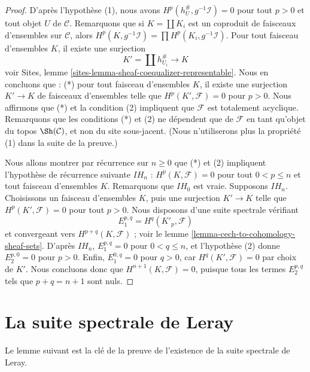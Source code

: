 \begin{proof}
D'après l'hypothèse (1), nous avons
$H^p(h_U^\#, g^{-1}\mathcal{I}) = 0$ pour tout $p > 0$ et tout objet $U$ de
$\mathcal{C}$. Remarquons que si $K = \coprod K_i$ est un coproduit de
faisceaux d'ensembles sur $\mathcal{C}$, alors
$H^p(K, g^{-1}\mathcal{I}) = \prod H^p(K_i, g^{-1}\mathcal{I})$.
Pour tout faisceau d'ensembles $K$, il existe une surjection
$$
K' = \coprod h_{U_i}^\# \longrightarrow K
$$
voir Sites, lemme \ref{sites-lemma-sheaf-coequalizer-representable}.
Nous en concluons que : (*) pour tout faisceau d'ensembles $K$, il existe une
surjection $K' \to K$ de faisceaux d'ensembles telle que
$H^p(K', \mathcal{F}) = 0$ pour $p > 0$. Nous affirmons que (*) et la
condition (2) impliquent que $\mathcal{F}$ est totalement acyclique.
Remarquons que les conditions (*) et (2) ne dépendent que de $\mathcal{F}$ en
tant qu'objet du topos $\Sh(\mathcal{C})$, et non du site sous-jacent.
(Nous n'utiliserons plus la propriété (1) dans la suite de la preuve.)

\medskip\noindent
Nous allons montrer par récurrence sur $n \geq 0$ que (*) et (2) impliquent
l'hypothèse de récurrence suivante $IH_n$ :
$H^p(K, \mathcal{F}) = 0$ pour tout $0 < p \leq n$ et tout faisceau
d'ensembles $K$. Remarquons que $IH_0$ est vraie. Supposons $IH_n$.
Choisissons un faisceau d'ensembles $K$, puis une surjection $K' \to K$ telle
que $H^p(K', \mathcal{F}) = 0$ pour tout $p > 0$. Nous disposons d'une suite
spectrale vérifiant
$$
E_1^{p, q} = H^q(K'_p, \mathcal{F})
$$
et convergeant vers $H^{p + q}(K, \mathcal{F})$ ; voir le
lemme \ref{lemma-cech-to-cohomology-sheaf-sets}.
D'après $IH_n$, $E_1^{p, q} = 0$ pour $0 < q \leq n$, et l'hypothèse (2)
donne $E_2^{p, 0} = 0$ pour $p > 0$. Enfin, $E_1^{0, q} = 0$ pour $q > 0$,
car $H^q(K', \mathcal{F}) = 0$ par choix de $K'$. Nous concluons donc que
$H^{n + 1}(K, \mathcal{F}) = 0$, puisque tous les termes $E_2^{p, q}$ tels
que $p + q = n + 1$ sont nuls.
\end{proof}







\section{La suite spectrale de Leray}
\label{section-leray}

\noindent
Le lemme suivant est la clé de la preuve de l'existence de la suite spectrale
de Leray.

